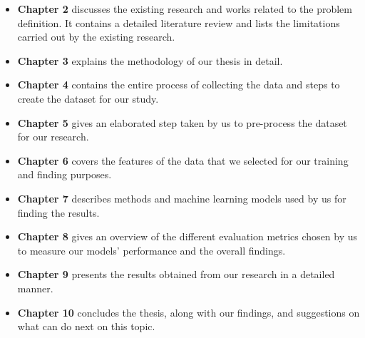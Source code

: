 \begin{itemize}
    \item {
        \textbf{Chapter 2} discusses the existing research and works related to the problem definition. It contains a detailed literature review and lists the limitations carried out by the existing research.
    }

    \item {
        \textbf{Chapter 3} explains the methodology of our thesis in detail.
    }

    \item {
        \textbf{Chapter 4} contains the entire process of collecting the data and steps to create the dataset for our study.
    }

    \item {
        \textbf{Chapter 5} gives an elaborated step taken by us to pre-process the dataset for our research.
    }

    \item {
        \textbf{Chapter 6} covers the features of the data that we selected for our training and finding purposes.
    }

    \item {
        \textbf{Chapter 7} describes methods and machine learning models used by us for finding the results.
    }

    \item {
        \textbf{Chapter 8} gives an overview of the different evaluation metrics chosen by us to measure our models' performance and the overall findings.
    }

    \item {
        \textbf{Chapter 9} presents the results obtained from our research in a detailed manner.
    }

    \item {
        \textbf{Chapter 10} concludes the thesis, along with our findings, and suggestions on what can do next on this topic.
    }
\end{itemize}

